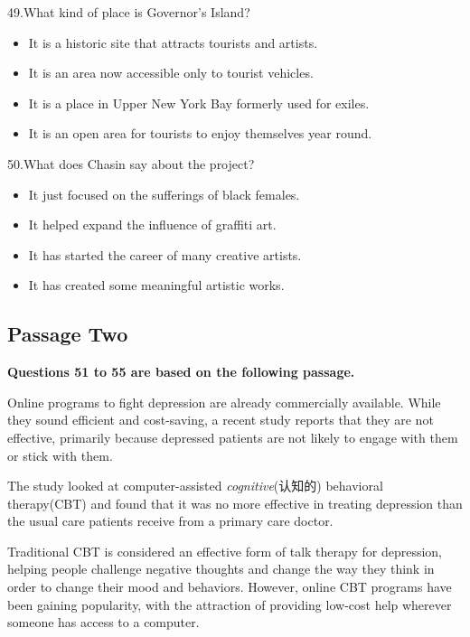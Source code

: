 \documentclass[UTF8,11pt]{ctexart}
\begin{document}
49.What kind of place is Governor’s Island?


\begin{itemize}[leftmargin=2em,itemsep=.2em,topsep=.4em]\item[A.] It is a historic site that attracts tourists and artists.
\item[B.] It is an area now accessible only to tourist vehicles.
\item[C.] It is a place in Upper New York Bay formerly used for exiles.
\item[D.] It is an open area for tourists to enjoy themselves year round.
\end{itemize}

50.What does Chasin say about the project?


\begin{itemize}[leftmargin=2em,itemsep=.2em,topsep=.4em]\item[A.] It just focused on the sufferings of black females.
\item[B.] It helped expand the influence of graffiti art.
\item[C.] It has started the career of many creative artists.
\item[D.] It has created some meaningful artistic works.
\end{itemize}

\subsection*{\textbf{Passage Two}}


\textbf{Questions 51 to 55 are based on the following passage.}


Online programs to fight depression are already commercially available. While they sound efficient and cost-saving, a recent study reports that they are not effective, primarily because depressed patients are not likely to engage with them or stick with them.


The study looked at computer-assisted\textit{ cognitive}(认知的) behavioral therapy(CBT) and found that it was no more effective in treating depression than the usual care patients receive from a primary care doctor.


Traditional CBT is considered an effective form of talk therapy for depression, helping people challenge negative thoughts and change the way they think in order to change their mood and behaviors. However, online CBT programs have been gaining popularity, with the attraction of providing low-cost help wherever someone has access to a computer.
\end{document}
